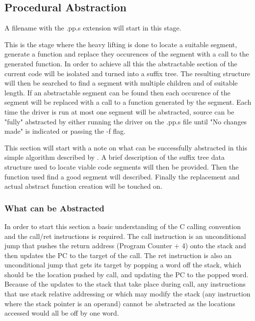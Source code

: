 \documentclass[9pt,nocopyrightspace]{sigplanconf}
\begin{document}
\subsection{Procedural Abstraction}

A filename with the .pp.s extension will start in this stage.

This is the stage where the heavy lifting is done to locate a suitable segment, generate a function and replace they occurences of the segment with a call to the generated function.
In order to achieve all this the abstractable section of the current code will be isolated and turned into a suffix tree.
The resulting structure will then be searched to find a segment with multiple children and of suitable length.
If an abstractable segment can be found then each occurence of the segment will be replaced with a call to a function generated by the segment.
Each time the driver is run at most one segment will be abstracted, source can be "fully" abstracted by either running the driver on the .pp.s file until "No changes made" is indicated or passing the -f flag.

This section will start with a note on what can be successfully abstracted in this simple algorithm described by \cite{theory01}.
A brief description of the suffix tree data structure used to locate viable code segments will then be provided.
Then the function used find a good segment will described.
Finally the replacement and actual abstract function creation will be touched on.

\subsubsection{What can be Abstracted}

In order to start this section a basic understanding of the C calling convention and the call/ret instructions is required.
The call instruction is an unconditional jump that pushes the return address (Program Counter + 4) onto the stack and then updates the PC to the target of the call.
The ret instruction is also an unconditional jump that gets its target by popping a word off the stack, which should be the location pushed by call, and updating the PC to the popped word.
Because of the updates to the stack that take place during call, any instructions that use stack relative addressing or which may modify the stack (any instruction where the stack pointer is an operand) cannot be abstracted as the locations accessed would all be off by one word.
\end{document}
